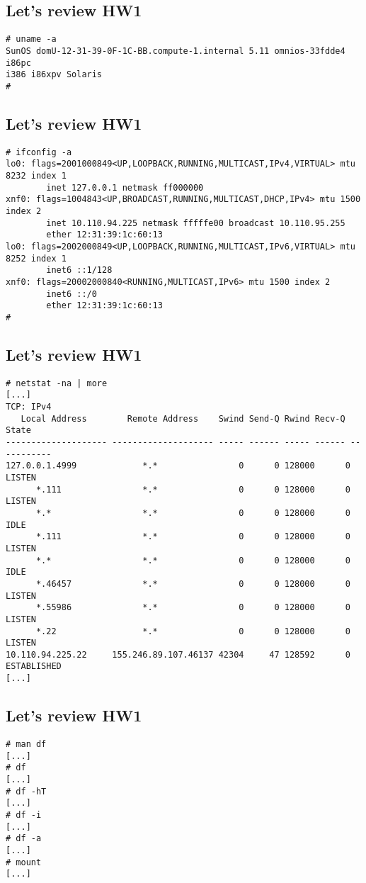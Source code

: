 \documentclass[xga]{xdvislides}
\begin{document}
\subsection{Let's review HW1}
\begin{verbatim}
# uname -a
SunOS domU-12-31-39-0F-1C-BB.compute-1.internal 5.11 omnios-33fdde4 i86pc
i386 i86xpv Solaris
#
\end{verbatim}

\subsection{Let's review HW1}
\begin{verbatim}
# ifconfig -a
lo0: flags=2001000849<UP,LOOPBACK,RUNNING,MULTICAST,IPv4,VIRTUAL> mtu 8232 index 1
        inet 127.0.0.1 netmask ff000000
xnf0: flags=1004843<UP,BROADCAST,RUNNING,MULTICAST,DHCP,IPv4> mtu 1500 index 2
        inet 10.110.94.225 netmask fffffe00 broadcast 10.110.95.255
        ether 12:31:39:1c:60:13
lo0: flags=2002000849<UP,LOOPBACK,RUNNING,MULTICAST,IPv6,VIRTUAL> mtu 8252 index 1
        inet6 ::1/128
xnf0: flags=20002000840<RUNNING,MULTICAST,IPv6> mtu 1500 index 2
        inet6 ::/0
        ether 12:31:39:1c:60:13
#
\end{verbatim}


\subsection{Let's review HW1}
\begin{verbatim}
# netstat -na | more
[...]
TCP: IPv4
   Local Address        Remote Address    Swind Send-Q Rwind Recv-Q
State
-------------------- -------------------- ----- ------ ----- ------ -----------
127.0.0.1.4999             *.*                0      0 128000      0 LISTEN
      *.111                *.*                0      0 128000      0 LISTEN
      *.*                  *.*                0      0 128000      0 IDLE
      *.111                *.*                0      0 128000      0 LISTEN
      *.*                  *.*                0      0 128000      0 IDLE
      *.46457              *.*                0      0 128000      0 LISTEN
      *.55986              *.*                0      0 128000      0 LISTEN
      *.22                 *.*                0      0 128000      0 LISTEN
10.110.94.225.22     155.246.89.107.46137 42304     47 128592      0 ESTABLISHED
[...]
\end{verbatim}

\subsection{Let's review HW1}
\begin{verbatim}
# man df
[...]
# df
[...]
# df -hT
[...]
# df -i
[...]
# df -a
[...]
# mount
[...]
\end{verbatim}
\end{document}
